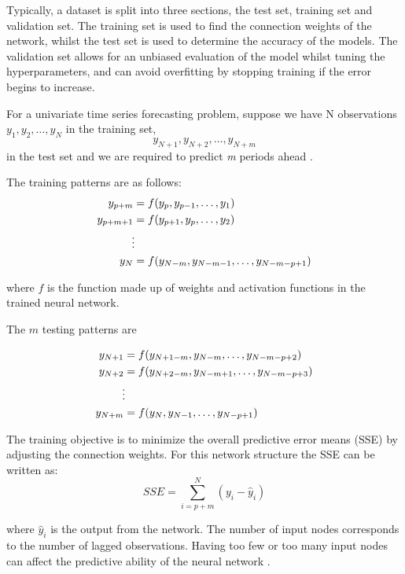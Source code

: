 Typically, a dataset is split into three sections, the test set, training set and validation set. The training set is used to find the connection weights of the network, whilst the test set is used to determine the accuracy of the models. The validation set allows for an unbiased evaluation of the model whilst tuning the hyperparameters, and can avoid overfitting by stopping training if the error begins to increase.

For a univariate time series forecasting problem, suppose we have N observations $y_1, y_2, \ldots, y_N$ in the training set, 
\begin{equation}
y_{N+1}, y_{N+2}, \ldots, y_{N+m}
\end{equation}
\noindent in the test set and we are required to predict \textit{m} periods ahead \cite{Pao2007}. 

The training patterns are as follows:
\begin{align}
y_{p+m} & =f(y_p, y_{p-1},\ldots,y_1)\\
y_{p+m+1} & =f(y_{p+1}, y_{p},\ldots,y_2)\\
&\vdotswithin  \notag \\
y_{N} & =f(y_{N-m},y_{N-m-1},\ldots,y_{N-m-p+1})
\end{align}

\noindent where $f$ is the function made up of weights and activation functions in the trained neural network.

The $m$ testing patterns are 

\begin{align}
y_{N+1} & =f(y_{N+1-m}, y_{N-m},\ldots,y_{N-m-p+2})\\
y_{N+2} & =f(y_{N+2-m}, y_{N-m+1},\ldots,y_{N-m-p+3})\\
&\vdotswithin  \notag \\
y_{N+m} & =f(y_{N},y_{N-1},\ldots,y_{N-p+1})
\end{align}

The training objective is to minimize the overall predictive error means (SSE) by adjusting the connection weights. For this network structure the SSE can be written as:
\begin{equation}
SSE = \sum_{i=p+m}^N(y_i-\hat{y}_i)
\end{equation}

\noindent where $\hat{y}_i$ is the output from the network. The number of input nodes corresponds to the number of lagged observations. Having too few or too many input nodes can affect the predictive ability of the neural network \cite{Pao2007}.




